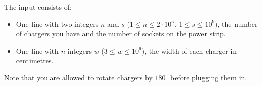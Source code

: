 
The input consists of:
\begin{itemize}
\item
One line with two integers $n$ and $s$ $(1\leq n\leq2\cdot 10^5$,  $1\leq s\leq10^9)$, the number of chargers you have and the number of sockets on the power strip.
\item
One line with $n$ integers $w$ ($3\leq w\leq10^9$),
the width of each charger in centimetres.
\end{itemize}
Note that you are allowed to rotate chargers by $180^\circ$ before plugging them in.
